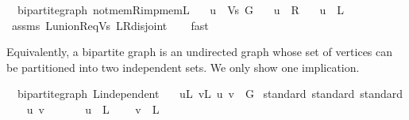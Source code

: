 \begin{isabellebody}
%
\isadeliminvisible
\isanewline
%
\endisadeliminvisible
%
\isataginvisible
{}\isamarkupfalse%
\ {\isacharparenleft}{\kern0pt}\ bipartite{\isacharunderscore}{\kern0pt}graph{\isacharparenright}{\kern0pt}\ not{\isacharunderscore}{\kern0pt}mem{\isacharunderscore}{\kern0pt}R{\isacharunderscore}{\kern0pt}imp{\isacharunderscore}{\kern0pt}mem{\isacharunderscore}{\kern0pt}L{\isacharcolon}{\kern0pt}\isanewline
\ \ \ {\isachardoublequoteopen}u\ {\isasymin}\ Vs\ G{\isachardoublequoteclose}\isanewline
\ \ \ {\isachardoublequoteopen}u\ {\isasymnotin}\ R{\isachardoublequoteclose}\isanewline
\ \ \ {\isachardoublequoteopen}u\ {\isasymin}\ L{\isachardoublequoteclose}%
\endisataginvisible
{\isafoldinvisible}%
%
\isadeliminvisible
\isanewline
%
\endisadeliminvisible
%
\isadelimproof
\ \ %
\endisadelimproof
%
\isatagproof
{}\isamarkupfalse%
\ assms\ L{\isacharunderscore}{\kern0pt}union{\isacharunderscore}{\kern0pt}R{\isacharunderscore}{\kern0pt}eq{\isacharunderscore}{\kern0pt}Vs\ L{\isacharunderscore}{\kern0pt}R{\isacharunderscore}{\kern0pt}disjoint\isanewline
\ \ \isamarkupfalse%
\ fast%
\endisatagproof
{\isafoldproof}%
%
\isadelimproof
%
\endisadelimproof
%
\begin{isamarkuptext}%
Equivalently, a bipartite graph is an undirected graph whose set of vertices can be partitioned into
two independent sets. We only show one implication.%
\end{isamarkuptext}\isamarkuptrue%
\isamarkupfalse%
\ {\isacharparenleft}{\kern0pt}\ bipartite{\isacharunderscore}{\kern0pt}graph{\isacharparenright}{\kern0pt}\ L{\isacharunderscore}{\kern0pt}independent{\isacharcolon}{\kern0pt}\isanewline
\ \ \ {\isachardoublequoteopen}{\isasymforall}u{\isasymin}L{\isachardot}{\kern0pt}\ {\isasymforall}v{\isasymin}L{\isachardot}{\kern0pt}\ {\isacharbraceleft}{\kern0pt}u{\isacharcomma}{\kern0pt}\ v{\isacharbraceright}{\kern0pt}\ {\isasymnotin}\ G{\isachardoublequoteclose}\isanewline
%
\isadelimproof
%
\endisadelimproof
%
\isatagproof
{}\isamarkupfalse%
\ {\isacharparenleft}{\kern0pt}standard{\isacharcomma}{\kern0pt}\ standard{\isacharcomma}{\kern0pt}\ standard{\isacharparenright}{\kern0pt}\isanewline
\ \ \isamarkupfalse%
\ u\ v\isanewline
\ \ \isamarkupfalse%
\isanewline
\ \ \ \ {\isachardoublequoteopen}u\ {\isasymin}\ L{\isachardoublequoteclose}\isanewline
\ \ \ \ {\isachardoublequoteopen}v\ {\isasymin}\ L{\isachardoublequoteclose}\isanewline

\end{isabellebody}

